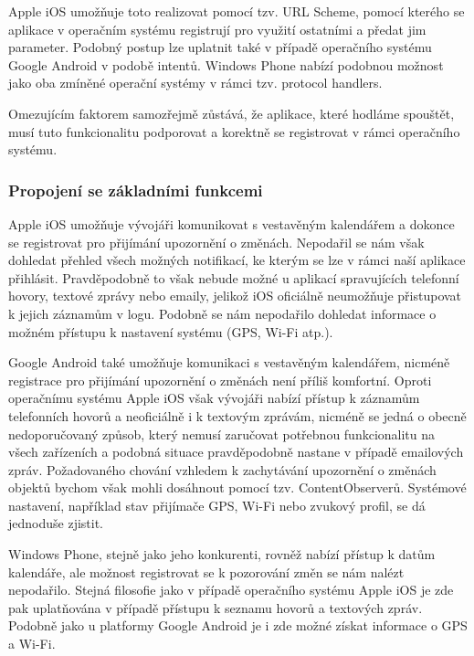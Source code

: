 \documentclass[thesis=M,czech]{FITthesis}[2012/06/26]
\begin{document}
Apple iOS umožňuje toto realizovat pomocí tzv. URL Scheme\cite{apple_url_scheme}, pomocí kterého se aplikace v operačním systému registrují pro využití ostatními\cite{apple_app_launch} a předat jim parameter\cite{apple_app_launch2}. Podobný postup lze uplatnit také v případě operačního systému Google Android v podobě intentů\cite{android_app_launch}. Windows Phone nabízí podobnou možnost jako oba zmíněné operační systémy v rámci tzv. protocol handlers\cite{win_app_launch}.

Omezujícím faktorem samozřejmě zůstává, že aplikace, které hodláme spouštět, musí tuto funkcionalitu podporovat a korektně se registrovat v rámci operačního systému.

\subsubsection{Propojení se základními funkcemi}
Apple iOS umožňuje vývojáři komunikovat s vestavěným kalendářem a dokonce se registrovat pro přijímání upozornění o změnách\cite{apple_listener}. Nepodařil se nám však dohledat přehled všech možných notifikací, ke kterým se lze v rámci naší aplikace přihlásit. Pravděpodobně to však nebude možné u aplikací spravujících telefonní hovory, textové zprávy nebo emaily, jelikož iOS oficiálně neumožňuje přistupovat k jejich záznamům v logu\cite{apple_history}. Podobně se nám nepodařilo dohledat informace o možném přístupu k nastavení systému (GPS, Wi-Fi atp.).

Google Android také umožňuje komunikaci s vestavěným kalendářem\cite{android_calendar}\cite{android_calendar2}, nicméně registrace pro přijímání upozornění o změnách není příliš komfortní\cite{android_calendar3}\cite{android_calendar4}. Oproti operačnímu systému Apple iOS však vývojáři nabízí přístup k záznamům telefonních hovorů\cite{android_calllog} a neoficiálně i k textovým zprávám, nicméně se jedná o obecně nedoporučovaný způsob, který nemusí zaručovat potřebnou funkcionalitu na všech zařízeních\cite{android_sms} a podobná situace pravděpodobně nastane v případě emailových zpráv. Požadovaného chování vzhledem k zachytávání upozornění o změnách objektů bychom však mohli dosáhnout pomocí tzv. ContentObserverů\cite{android_observer}. Systémové nastavení, například stav přijímače GPS\cite{android_gps}, Wi-Fi\cite{android_wifi} nebo zvukový profil\cite{android_profile}, se dá jednoduše zjistit.

Windows Phone, stejně jako jeho konkurenti, rovněž nabízí přístup k datům kalendáře\cite{win_calendar}, ale možnost registrovat se k pozorování změn se nám nalézt nepodařilo. Stejná filosofie jako v případě operačního systému Apple iOS je zde pak uplatňována v případě přístupu k seznamu hovorů a textových zpráv\cite{win_incoming_event}. Podobně jako u platformy Google Android je i zde možné získat informace o GPS\cite{win_location} a Wi-Fi\cite{win_wifi}.
\end{document}
